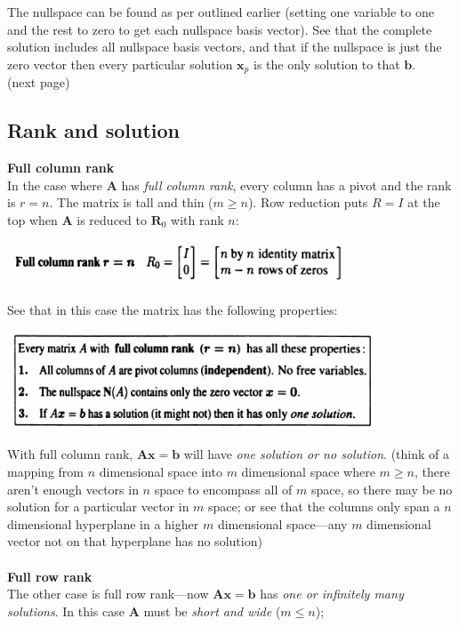 \documentclass{report}
\begin{document}
The nullspace can be found as per outlined earlier (setting one variable to one and the rest to zero to get each nullspace basis vector). See 
that the complete solution includes all nullspace basis vectors, and 
that if the nullspace is just the zero vector then every particular solution $\bm x_p$ is the only solution to that $\bm b$.\\
(next page)\newpage
\subsection{Rank and solution}
\textbf{Full column rank}\\
In the case where $\bm A$ has \textit{full column rank}, every column has a pivot and the rank is $r=n$. The matrix is tall and thin ($m\geq n$). 
Row reduction puts $R=I$ at the top when $\bm A$ is reduced to $\bm R_0$ with rank $n$:
\begin{center}
\includegraphics[width=10cm]{40}\\
\end{center}
See that in this case the matrix has the following properties:
\begin{center}
\includegraphics[width=11cm]{41}\\
\end{center}
With full column rank, $\bm{Ax}=\bm b$ will have \textit{one solution or no solution}. (think of a mapping from $n$ dimensional space into $m$ dimensional space
where $m\geq n$, there aren't enough vectors in $n$ space to encompass all of $m$ space, so there may be no solution for a particular vector in $m$ space; or see 
that the columns only span a $n$ dimensional hyperplane in a higher $m$ dimensional space---any $m$ dimensional vector not on that hyperplane has no solution)\\
\vspace{1mm}\\
\textbf{Full row rank}\\
The other case is full row rank---now $\bm{Ax}=\bm b$ has \textit{one or infinitely many solutions}. In this case $\bm A$ must be \textit{short and wide} ($m\leq n$);
\end{document}
